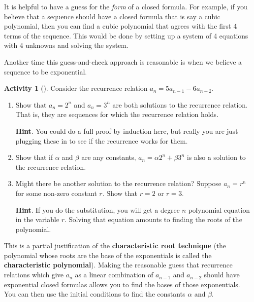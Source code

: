\documentclass[10pt,]{book}
\newcommand{\terminology}[1]{\textbf{#1}}
\theoremstyle{plain}
\theoremstyle{definition}
\theoremstyle{definition}
\theoremstyle{definition}
\newtheorem{activity}[project]{Activity}
\numberwithin{equation}{chapter}
\begin{document}
\hypertarget{p-946}{}%
It is helpful to have a guess for the \emph{form} of a closed formula.  For example, if you believe that a sequence should have a closed formula that is say a cubic polynomial, then you can find a cubic polynomial that agrees with the first 4 terms of the sequence.  This would be done by setting up a system of 4 equations with 4 unknowns and solving the system.%
\par
\hypertarget{p-947}{}%
Another time this guess-and-check approach is reasonable is when we believe a sequence to be exponential.%
\begin{activity}[]\label{activity-141}
\hypertarget{p-948}{}%
Consider the recurrence relation \(a_n = 5a_{n-1} - 6a_{n-2}\).%
\begin{enumerate}[font=\bfseries,label=(\alph*),ref=\alph*]
\item\label{task-180} \hypertarget{p-949}{}%
Show that \(a_n = 2^n\) and \(a_n = 3^n\) are both solutions to the recurrence relation.  That is, they are sequences for which the recurrence relation holds.%
\par\smallskip%
\noindent\textbf{Hint}.\hypertarget{hint-106}{}\quad%
\hypertarget{p-950}{}%
You could do a full proof by induction here, but really you are just plugging these in to see if the recurrence works for them.%
\item\label{task-181} \hypertarget{p-951}{}%
Show that if \(\alpha\) and \(\beta\) are any constants, \(a_n = \alpha 2^n + \beta 3^n\) is also a solution to the recurrence relation.%
\item\label{task-182} \hypertarget{p-952}{}%
Might there be another solution to the recurrence relation?  Suppose \(a_n = r^n\) for some non-zero constant \(r\).  Show that \(r = 2\) or \(r = 3\).%
\par\smallskip%
\noindent\textbf{Hint}.\hypertarget{hint-107}{}\quad%
\hypertarget{p-953}{}%
If you do the substitution, you will get a degree \(n\) polynomial equation in the variable \(r\).  Solving that equation amounts to finding the roots of the polynomial.%
\end{enumerate}
\end{activity}
\hypertarget{p-954}{}%
This is a partial justification of the \terminology{characteristic root technique} (the polynomial whose roots are the base of the exponentials is called the \terminology{characteristic polynomial}).  Making the reasonable guess that recurrence relations which give \(a_n\) as a linear combination of \(a_{n-1}\) and \(a_{n-2}\) should have exponential closed formulas allows you to find the bases of those exponentials.  You can then use the initial conditions to find the constants \(\alpha\) and \(\beta\).%
\end{document}
